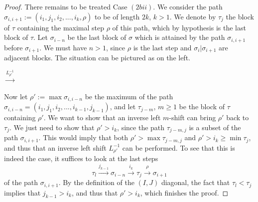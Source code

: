\documentclass{amsart}
\theoremstyle{definition}
\begin{document}
\begin{proof}
There remains to be treated Case $(2bii)$.
We consider the path $\sigma_{i,i+1}:=(i_1,j_1,i_2,...,i_{k},\rho)$ to be of length $2k$, $k>1$. 
We denote by $\tau_j$ the block of $\tau$ containing the maximal step $\rho$ of this path, which by hypothesis is the last block of $\tau$. 
Let $\sigma_{i-n}$ be the last block of $\sigma$ which is attained by the path $\sigma_{i,i+1}$ before $\sigma_{i+1}$. 
We must have $n>1$, since $\rho$ is the last step and $\sigma_i|\sigma_{i+1}$ are adjacent blocks.
The situation can be pictured as on the left.
\begin{center}
$\xrightarrow{L_{\rho'}^{-1}}$
\end{center}
Now let $\rho':=\max\sigma_{i,i-n}$ be the maximum of the path $\sigma_{i,i-n}=(i_1,j_1,i_2,...,i_{k-1},j_{k-1})$, and let $\tau_{j-m}$, $m\geq 1$ be the block of $\tau$ containing $\rho'$.
We want to show that an inverse left $m$-shift can bring $\rho'$ back to $\tau_j$.  
We just need to show that $\rho' > i_k$, since the path $\tau_{j-m,j}$ is a subset of the path $\sigma_{i,i+1}$. 
This would imply that both $\rho' > \max \tau_{j-m,j}$ and $\rho' > i_k \geq \min \tau_j$, and thus that an inverse left shift $L_{\rho'}^{-1}$ can be performed.
To see that this is indeed the case, it suffices to look at the last steps $$\tau_l \overset{j_{k-1}}{\longrightarrow} \sigma_{i-n} \overset{i_{k}}{\longrightarrow} \tau_j \overset{\rho}{\longrightarrow} \sigma_{i+1}$$ of the path $\sigma_{i,i+1}$. 
By the definition of the $(I,J)$ diagonal, the fact that $\tau_l < \tau_j$ implies that $j_{k-1} > i_k$, and thus that $\rho' > i_k$, which finishes the proof. 
\end{proof}
\end{document}
